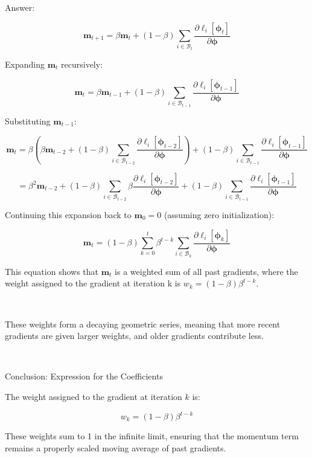 \documentclass[10pt]{article}
\begin{document}
\noindent Answer: 


\[
\mathbf{m}_{t+1} = \beta \mathbf{m}_t + (1 - \beta) \sum_{i \in \mathcal{B}_t} \frac{\partial \ell_i [\boldsymbol{\phi}_t]}{\partial \boldsymbol{\phi}}
\]

\noindent Expanding \( \mathbf{m}_t \) recursively:

\[
\mathbf{m}_t = \beta \mathbf{m}_{t-1} + (1 - \beta) \sum_{i \in \mathcal{B}_{t-1}} \frac{\partial \ell_i [\boldsymbol{\phi}_{t-1}]}{\partial \boldsymbol{\phi}}
\]

\noindent Substituting \( \mathbf{m}_{t-1} \):

\[
\mathbf{m}_t = \beta \left( \beta \mathbf{m}_{t-2} + (1 - \beta) \sum_{i \in \mathcal{B}_{t-2}} \frac{\partial \ell_i [\boldsymbol{\phi}_{t-2}]}{\partial \boldsymbol{\phi}} \right) + (1 - \beta) \sum_{i \in \mathcal{B}_{t-1}} \frac{\partial \ell_i [\boldsymbol{\phi}_{t-1}]}{\partial \boldsymbol{\phi}}
\]

\[
= \beta^2 \mathbf{m}_{t-2} + (1 - \beta) \sum_{i \in \mathcal{B}_{t-2}} \beta \frac{\partial \ell_i [\boldsymbol{\phi}_{t-2}]}{\partial \boldsymbol{\phi}} + (1 - \beta) \sum_{i \in \mathcal{B}_{t-1}} \frac{\partial \ell_i [\boldsymbol{\phi}_{t-1}]}{\partial \boldsymbol{\phi}}
\]

\noindent Continuing this expansion back to \( \mathbf{m}_0 = 0 \) (assuming zero initialization):

\[
\mathbf{m}_t = (1 - \beta) \sum_{k=0}^{t} \beta^{t-k} \sum_{i \in \mathcal{B}_k} \frac{\partial \ell_i [\boldsymbol{\phi}_k]}{\partial \boldsymbol{\phi}}
\]

\noindent This equation shows that \( \mathbf{m}_t \) is a weighted sum of all past gradients, where the weight assigned to the gradient at iteration k is  \( w_k = (1 - \beta) \beta^{t-k} \). 

\ 

\noindent These weights form a decaying geometric series, meaning that more recent gradients are given larger weights, and older gradients contribute less.

\ 

\noindent Conclusion: Expression for the Coefficients

\noindent The weight assigned to the gradient at iteration \( k \) is:

\[
w_k = (1 - \beta) \beta^{t-k}
\]

\noindent These weights sum to 1 in the infinite limit, ensuring that the momentum term remains a properly scaled moving average of past gradients.
\end{document}
